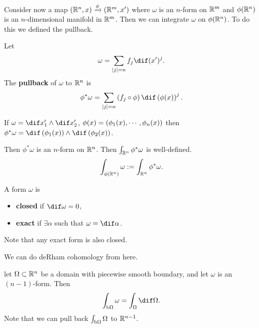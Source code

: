 Consider now a map $(\mathbb{R}^n , x) \xrightarrow[]{\phi} (\mathbb{R}^m , x')$ where $\omega$ is an $n$-form on $\mathbb{R}^m$ and $\phi(\mathbb{R}^n)$ is an $n$-dimensional manifold in $\mathbb{R}^m$. Then we can integrate $\omega$ on $\phi(\mathbb{R}^n)$. To do this we defined the pullback.

\begin{definition}
    Let 
    \begin{align*}
        \omega = \sum_{|j| = n} f_j \dif (x')^j.
    \end{align*}
    The \textbf{pullback} of $\omega$ to $\mathbb{R}^n$ is
    \begin{align*}
        \phi^* \omega = \sum_{|j| = n} \br{f_j \circ \phi} \dif \br{\phi(x)}^j.
    \end{align*}
\end{definition}

\begin{example}
    If $\omega = \dif x'_1 \wedge \dif x'_2$, $\phi(x) = \left(  \phi_1(x) , \cdots, \phi_n(x) \right)$ then $\phi^* \omega = \dif \br{\phi_1 (x) } \wedge \dif \br{\phi_2 (x) }$.
\end{example}

Then $\phi^* \omega$ is an $n$-form on $\mathbb{R}^n$. Then $\int_{\mathbb{R}^n} \phi^* \omega$ is well-defined.
\begin{align*}
    \int_{\phi(\mathbb{R}^n)} \omega := \int_{\mathbb{R}^n} \phi^* \omega.
\end{align*}

\begin{definition}
    A form $\omega$ is
    \begin{itemize}
        \item \textbf{closed} if $\dif \omega = 0$,
        \item \textbf{exact} if $\exists \alpha $ such that $\omega = \dif \alpha$.
    \end{itemize}
\end{definition}

Note that any exact form is also closed.
\begin{remark}
    We can do deRham cohomology from here.
\end{remark}

\begin{theorem}[Stokes]
    let $\Omega \subset \mathbb{R}^n$ be a domain with piecewise smooth boundary, and let $\omega$ is an $(n-1)$-form. Then
    \begin{align*}
        \int_{\bdy \om} \omega = \int_{\om } \dif \om.
    \end{align*}
    Note that we can pull back $\int_{\operatorname{b}\! \Omega} \Omega$ to $\mathbb{R}^{n-1}.$
\end{theorem}

